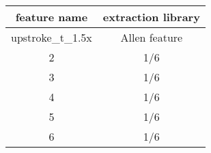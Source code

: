 \begin{table}[]
\begin{tabular}{|c|c|}
\hline  feature name  & extraction library \T \\\hline
  upstroke_t_1.5x \T & Allen feature \\\hline
  2 \T & 1/6 \\\hline
  3 \T & 1/6 \\\hline
  4 \T & 1/6 \\\hline
  5 \T & 1/6 \\\hline
  6 \T & 1/6 \\\hline
\end{tabular}
\end{table}